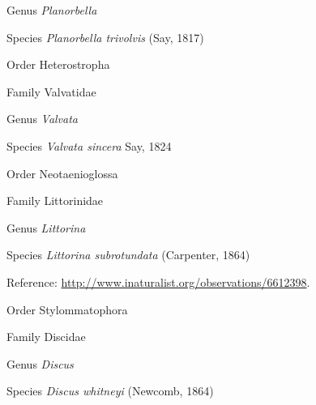 \documentclass[9pt, article]{memoir}
\begin{document}
\begin{multicols}{2}
\vspace{6pt}\noindent\hspace{30pt}Genus \textit{Planorbella}


\vspace{6pt}\noindent\hspace{36pt}Species \textit{Planorbella trivolvis} (Say, 1817)


\vspace{6pt}\noindent\hspace{18pt}Order Heterostropha


\vspace{6pt}\noindent\hspace{24pt}Family Valvatidae


\vspace{6pt}\noindent\hspace{30pt}Genus \textit{Valvata}


\vspace{6pt}\noindent\hspace{36pt}Species \textit{Valvata sincera} Say, 1824


\vspace{6pt}\noindent\hspace{18pt}Order Neotaenioglossa


\vspace{6pt}\noindent\hspace{24pt}Family Littorinidae


\vspace{6pt}\noindent\hspace{30pt}Genus \textit{Littorina}


\vspace{6pt}\noindent\hspace{36pt}Species \textit{Littorina subrotundata} (Carpenter, 1864)


\vspace{6pt}Reference: 
\url{http://www.inaturalist.org/observations/6612398}.

\vspace{6pt}\noindent\hspace{18pt}Order Stylommatophora


\vspace{6pt}\noindent\hspace{24pt}Family Discidae


\vspace{6pt}\noindent\hspace{30pt}Genus \textit{Discus}


\vspace{6pt}\noindent\hspace{36pt}Species \textit{Discus whitneyi} (Newcomb, 1864)



\end{multicols}
\end{document}

